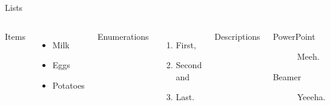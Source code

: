 \documentclass[aspectratio=169]{beamer}
\begin{document}

\begin{frame}{Lists}
  \begin{columns}[T,onlytextwidth]
      Items
      \begin{itemize}
        \item Milk \item Eggs \item Potatoes
      \end{itemize}

      Enumerations
      \begin{enumerate}
        \item First, \item Second and \item Last.
      \end{enumerate}

      Descriptions
      \begin{description}
        \item[PowerPoint] Meeh. \item[Beamer] Yeeeha.
      \end{description}
  \end{columns}
\end{frame}

\end{document}
